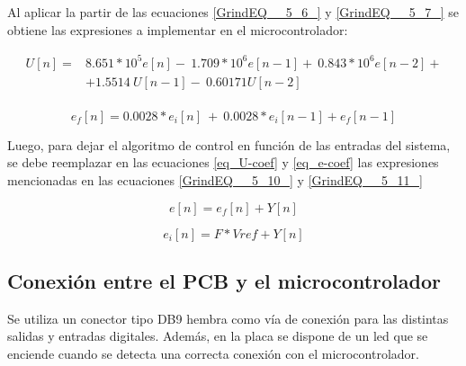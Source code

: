 \noindent Al aplicar la partir de las ecuaciones \ref{GrindEQ__5_6_} y \ref{GrindEQ__5_7_} se obtiene las expresiones a implementar en el microcontrolador:

\begin{equation} 
	\begin{aligned}\label{eq_U-coef}
	U[n]=&8.651*10^5e[n]-\ 1.709*10^6e[n-1]+\ 0.843*10^6e[n-2]+\\
		 &+1.5514\ U[n-1]-\ 0.60171U[n-2]\\ 
	\end{aligned}
\end{equation}

\begin{equation} \label{eq_e-coef} 
	e_f[n]=0.0028*e_i[n]\ +\ {0.0028*e}_i[n-1]+e_f[n-1] 
\end{equation} 


\noindent Luego, para dejar el algoritmo de control en funci\'{o}n de las entradas del sistema, se debe reemplazar en las ecuaciones \ref{eq_U-coef} y \ref{eq_e-coef} las expresiones mencionadas en las ecuaciones \ref{GrindEQ__5_10_} y \ref{GrindEQ__5_11_}

\begin{equation} \label{GrindEQ__5_10_} 
	e[n]=e_f[n]+Y[n] 
\end{equation} 

\begin{equation} \label{GrindEQ__5_11_} 
	e_i[n]=F*Vref+Y[n] 
\end{equation} 

\subsection{Conexi\'{o}n entre el PCB y el microcontrolador}

\noindent Se utiliza un conector tipo DB9 hembra como v\'{i}a de conexi\'{o}n para las distintas salidas y entradas digitales. Adem\'{a}s, en la placa se dispone de un led que se enciende cuando  se detecta una correcta conexi\'{o}n con el microcontrolador.







